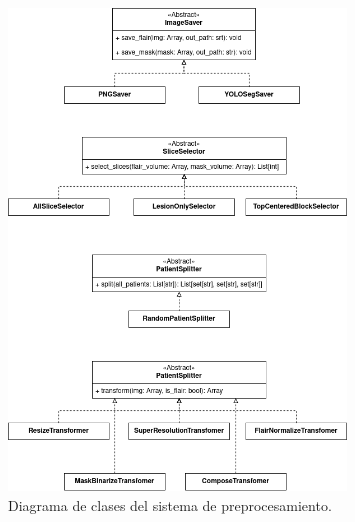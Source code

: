 \documentclass[../main.tex]{subfiles}
\begin{document}
\begin{figure}
    \centering
    \includegraphics[width=0.8\textwidth]{imgs/impl/preproces-diag-class.drawio.png}
    \caption{Diagrama de clases del sistema de preprocesamiento.}
    \label{fig:clases-preprocesamiento}
\end{figure}
\end{document}
